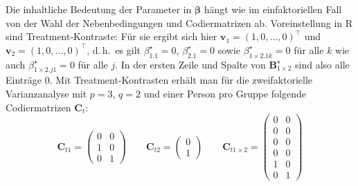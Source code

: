 Die inhaltliche Bedeutung der Parameter in $\bm{\beta}$ hängt wie im einfaktoriellen Fall von der Wahl der Nebenbedingungen und Codiermatrizen ab. Voreinstellung in R sind Treatment-Kontraste: Für sie ergibt sich hier $\bm{v}_{1} = (1, 0, \ldots, 0)^{\top}$ und $\bm{v}_{2} = (1, 0, \ldots, 0)^{\top}$, d.\,h.\ es gilt $\beta_{1.1}^{\star} = 0$, $\beta_{2.1}^{\star} = 0$ sowie $\beta_{1 \times 2.1k}^{\star} = 0$ für alle $k$ wie auch $\beta_{1 \times 2.j1}^{\star} = 0$ für alle $j$. In der ersten Zeile und Spalte von $\bm{B}_{1 \times 2}^{\star}$ sind also alle Einträge $0$. Mit Treatment-Kontrasten erhält man für die zweifaktorielle Varianzanalyse mit $p=3$, $q=2$ und einer Person pro Gruppe folgende Codiermatrizen $\bm{C}_{t}$:
\begin{equation*}
\bm{C}_{t1}          = \left(\begin{array}{cc} 0 & 0\\ 1 & 0\\ 0 & 1\end{array}\right) \qquad
\bm{C}_{t2}          = \left(\begin{array}{c}  0 \\ 1\end{array}\right) \qquad
\bm{C}_{t1 \times 2} = \left(\begin{array}{cc} 0 & 0\\ 0 & 0\\ 0 & 0\\ 0 & 0\\ 1 & 0\\ 0 & 1\end{array}\right)
\end{equation*}

